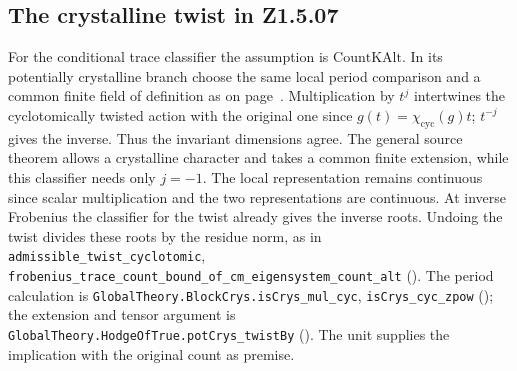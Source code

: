 \subsection{The crystalline twist in Z1.5.07}\label{r7:review:Z1.5.07}
For the conditional trace classifier the assumption is $\mathrm{CountKAlt}$. In its potentially crystalline branch choose the same local period comparison and a common finite field of definition as on page~\pageref{r6:review:Z1.5.07}. Multiplication by $t^j$ intertwines the cyclotomically twisted action with the original one since $g(t)=\chi_{\mathrm{cyc}}(g)t$; $t^{-j}$ gives the inverse. Thus the invariant dimensions agree. The general source theorem allows a crystalline character and takes a common finite extension, while this classifier needs only $j=-1$. The local representation remains continuous since scalar multiplication and the two representations are continuous. At inverse Frobenius the classifier for the twist already gives the inverse roots. Undoing the twist divides these roots by the residue norm, as in \nolinkurl{admissible_twist_cyclotomic}, \nolinkurl{frobenius_trace_count_bound_of_cm_eigensystem_count_alt} (). The period calculation is \nolinkurl{GlobalTheory.BlockCrys.isCrys_mul_cyc}, \nolinkurl{isCrys_cyc_zpow} (); the extension and tensor argument is \nolinkurl{GlobalTheory.HodgeOfTrue.potCrys_twistBy} (). The unit supplies the implication with the original count as premise.

